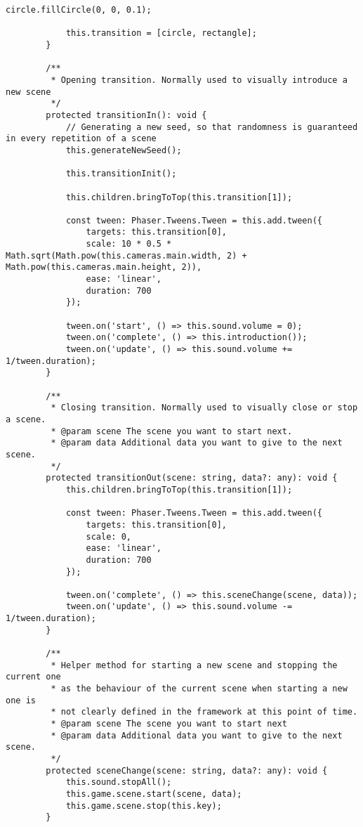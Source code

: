 \begin{lstlisting}[style=TypeScript, caption=BaseScene.ts]
            circle.fillCircle(0, 0, 0.1);

            this.transition = [circle, rectangle];
        }

        /**
         * Opening transition. Normally used to visually introduce a new scene
         */
        protected transitionIn(): void {
            // Generating a new seed, so that randomness is guaranteed in every repetition of a scene
            this.generateNewSeed();

            this.transitionInit();

            this.children.bringToTop(this.transition[1]);

            const tween: Phaser.Tweens.Tween = this.add.tween({
                targets: this.transition[0],
                scale: 10 * 0.5 * Math.sqrt(Math.pow(this.cameras.main.width, 2) + Math.pow(this.cameras.main.height, 2)),
                ease: 'linear',
                duration: 700
            });

            tween.on('start', () => this.sound.volume = 0);
            tween.on('complete', () => this.introduction());
            tween.on('update', () => this.sound.volume += 1/tween.duration);
        }

        /**
         * Closing transition. Normally used to visually close or stop a scene.
         * @param scene The scene you want to start next.
         * @param data Additional data you want to give to the next scene.
         */
        protected transitionOut(scene: string, data?: any): void {
            this.children.bringToTop(this.transition[1]);

            const tween: Phaser.Tweens.Tween = this.add.tween({
                targets: this.transition[0],
                scale: 0,
                ease: 'linear',
                duration: 700
            });

            tween.on('complete', () => this.sceneChange(scene, data));
            tween.on('update', () => this.sound.volume -= 1/tween.duration);
        }

        /**
         * Helper method for starting a new scene and stopping the current one
         * as the behaviour of the current scene when starting a new one is
         * not clearly defined in the framework at this point of time.
         * @param scene The scene you want to start next
         * @param data Additional data you want to give to the next scene.
         */
        protected sceneChange(scene: string, data?: any): void {
            this.sound.stopAll();
            this.game.scene.start(scene, data);
            this.game.scene.stop(this.key);
        }


\end{lstlisting}

